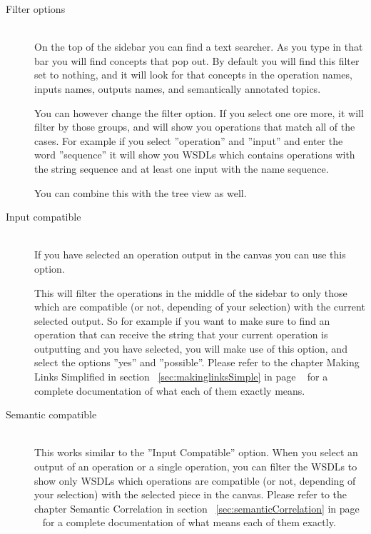 \documentclass[a4paper,10pt]{article}
\begin{document}
    \begin{description}
    \item[Filter options] \hfill \\
    On the top of the sidebar you can find a text searcher. As you type in that bar you will find concepts that pop out. By default you will find this filter set to nothing, and it will look for that concepts in the operation names, inputs names, outputs names, and semantically annotated topics.\vspace{3 mm}

    You can however change the filter option. If you select one ore more, it will filter by those groups, and will show you operations that match all of the cases. For example if you select ''operation'' and ''input'' and enter the word ''sequence'' it will show you WSDLs which contains operations with the string sequence and at least one input with the name sequence.\vspace{3 mm}

    You can combine this with the tree view as well. 
    \item[Input compatible] \hfill \\
    If you have selected an operation output in the canvas you can use this option.\vspace{3 mm}

    This will filter the operations in the middle of the sidebar to only those which are compatible (or not, depending of your selection) with the current selected output. So for example if you want to make sure to find an operation that can receive the string that your current operation is outputting and you have selected, you will make use of this option, and select the options ''yes'' and ''possible''. Please refer to the chapter Making Links Simplified in section ~\ref{sec:makinglinksSimple} in page ~\pageref{sec:makinglinksSimple} for a complete documentation of what each of them exactly means.\vspace{3 mm}

    \item[Semantic compatible] \hfill \\
    This works similar to the ''Input Compatible'' option. When you select an output of an operation or a single operation, you can filter the WSDLs to show only WSDLs which operations are compatible (or not, depending of your selection) with the selected piece in the canvas. Please refer to the chapter Semantic Correlation in section ~\ref{sec:semanticCorrelation} in page ~\pageref{sec:semanticCorrelation} for a complete documentation of what means each of them exactly.
    \end{description}
\end{document}
